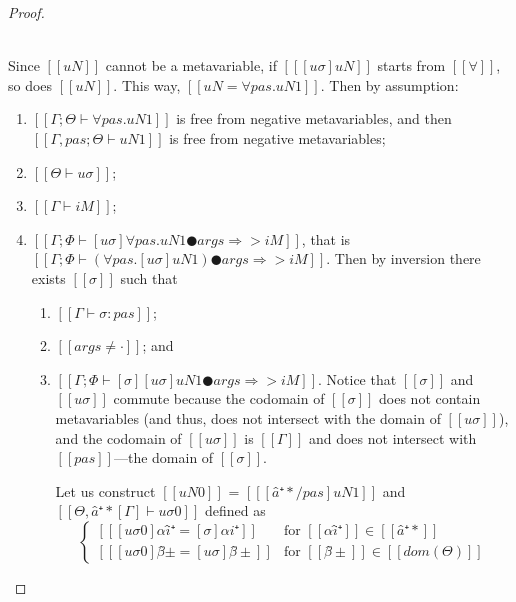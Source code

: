 \begin{proof}
\begin{caseof}
        \item {}\\
            Since $[[uN]]$ cannot be a metavariable,  
            if $[[ [uσ]uN ]]$ starts from $[[∀]]$,
            so does $[[uN]]$. This way,
            $[[uN = ∀pas.uN1]]$.
            Then by assumption:
            \begin{enumerate}
                \item $[[Γ; Θ ⊢ ∀pas.uN1]]$ is free from negative metavariables, 
                    and then $[[Γ, pas; Θ ⊢ uN1]]$ is free from negative metavariables;
                \item $[[Θ ⊢ uσ]]$;
                \item $[[Γ ⊢ iM]]$;
                \item $[[Γ; Φ ⊢ [uσ]∀pas.uN1 ● args ⇒> iM]]$, 
                    \label{point:typing-completeness-forall-app-inversion}
                    that is $[[Γ; Φ ⊢ (∀pas.[uσ]uN1) ● args ⇒> iM]]$.
                    Then by inversion there exists $[[σ]]$ such that 
                    \begin{enumerate}
                        \item $[[Γ ⊢ σ : pas]]$;
                        \item $[[args ≠ ·]]$; and
                        \item $[[Γ ; Φ ⊢ [σ][uσ]uN1 ● args ⇒> iM]]$.
                            \label{point:typing-completeness-forall-app-inversion-2}
                            Notice that $[[σ]]$ and $[[uσ]]$ commute because 
                            the codomain of $[[σ]]$ does not contain
                            metavariables (and thus, does not intersect with 
                            the domain of $[[uσ]]$), and the codomain of $[[uσ]]$ is 
                            $[[Γ]]$ and does not intersect with $[[pas]]$---the domain of $[[σ]]$.

                            Let us construct $[[uN0]]$ = $[[ [â⁺*/pas]uN1 ]]$
                            and $[[Θ, â⁺*[Γ] ⊢ uσ0]]$ defined as
                            $$
                            \begin{cases}
                                [[ [uσ0]αî⁺ = [σ]αi⁺ ]] & \text{for $[[αî⁺]] \in  [[â⁺*]]$ }\\
                                [[ [uσ0]β̂± = [uσ]β̂± ]] & \text{for $[[β̂±]] \in [[dom(Θ)]]$}
                            \end{cases}
                            $$


\end{enumerate}
\end{enumerate}
\end{caseof}
\end{proof}
